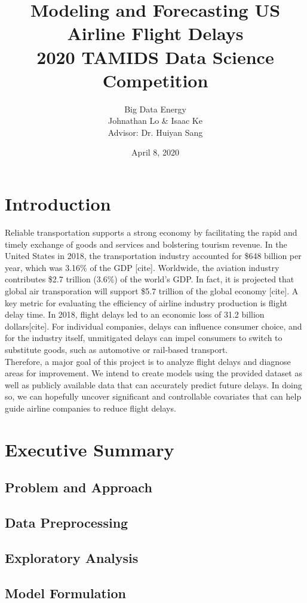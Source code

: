 \documentclass[12pt, a4paper]{book}
\title{Modeling and Forecasting US Airline Flight Delays\\2020 TAMIDS Data Science Competition}
\author{Big Data Energy\\Johnathan Lo \& Isaac Ke\\Advisor: Dr. Huiyan Sang}
\date{April 8, 2020}
\newcommand\tab[1][1cm]{\hspace*{#1}}
\begin{document}
\maketitle
\tableofcontents
\chapter{Introduction}
\tab Reliable transportation supports a strong economy by facilitating the rapid and timely exchange of goods and services and bolstering tourism revenue. In the United States in 2018, the transportation industry accounted for \$648 billion per year, which was 3.16\% of the GDP [cite]. Worldwide, the aviation industry contributes \$2.7 trillion (3.6\%) of the world's GDP. In fact, it is projected that global air transporation will support \$5.7 trillion of the global economy [cite]. A key metric for evaluating the efficiency of airline industry production is flight delay time. In 2018, flight delays led to an economic loss of 31.2 billion dollars[cite]. For individual companies, delays can influence consumer choice, and for the industry itself, unmitigated delays can impel consumers to switch to substitute goods, such as automotive or rail-based transport. \\
\tab Therefore, a major goal of this project is to analyze flight delays and diagnose areas for improvement. We intend to create models using the provided dataset as well as publicly available data that can accurately predict future delays. In doing so, we can hopefully uncover significant and controllable covariates that can help guide airline companies to reduce flight delays. 

\chapter{Executive Summary}
	\section{Problem and Approach}
	\section{Data Preprocessing}
	\section{Exploratory Analysis}
	\section{Model Formulation}
\end{document}
